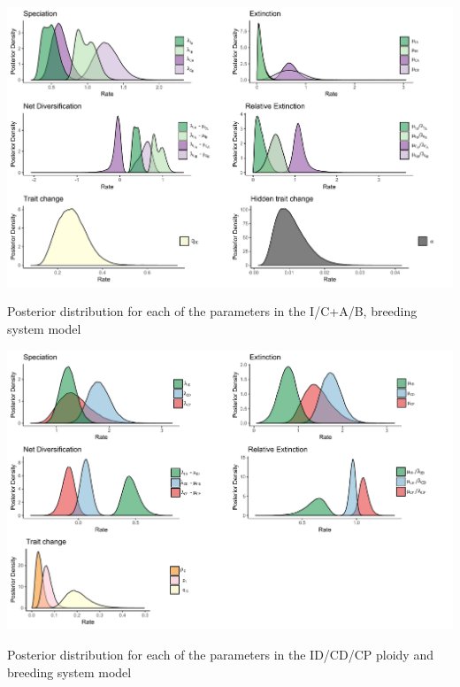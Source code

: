 
\begin{suppfigure}
\includegraphics[width=\textwidth]{hisseSInoretposteriordist.pdf}
\caption{Posterior distribution for each of the parameters in the I/C+A/B, breeding system model} %
\label{suppfigure:ICAB}
\end{suppfigure}


\begin{suppfigure}
\includegraphics[width=\textwidth]{musseDPSInodipposteriordist.pdf}
\caption{Posterior distribution for each of the parameters in the ID/CD/CP ploidy and breeding system model} %
\label{suppfigure:IDCDCPnodip}
\end{suppfigure}

